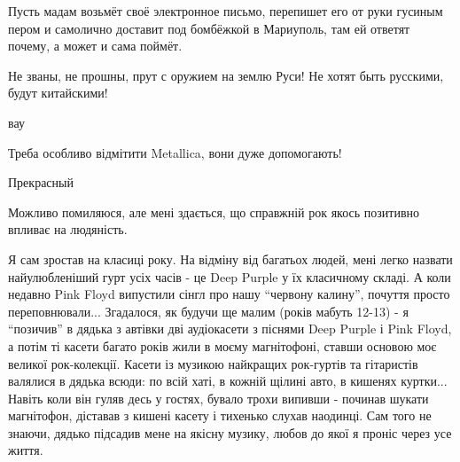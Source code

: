 \begin{itemize}
Пусть мадам возьмёт своё электронное письмо, перепишет его от руки гусиным
пером и самолично доставит под бомбёжкой в Мариуполь, там ей ответят почему, а
может и сама поймёт.

Не званы, не прошны, прут с оружием на землю Руси! Не хотят быть русскими,
будут китайскими!

вау

Треба особливо відмітити Metallica, вони дуже допомогають!

Прекрасный


Можливо помиляюся, але мені здається, що справжній рок якось позитивно впливає
на людяність.

Я сам зростав на класиці року. На відміну від багатьох людей, мені легко
назвати найулюбленіший гурт усіх часів - це Deep Purple у їх класичному складі.
А коли недавно Pink Floyd випустили сінгл про нашу \enquote{червону калину},
почуття просто переповнювали... Згадалося, як будучи ще малим (років мабуть
12-13) - я \enquote{позичив} в дядька з автівки дві аудіокасети з піснями Deep Purple і
Pink Floyd, а потім ті касети багато років жили в моєму магнітофоні, ставши
основою моє великої рок-колекції. Касети із музикою найкращих рок-гуртів та
гітаристів валялися в дядька всюди: по всій хаті, в кожній щілині авто, в
кишенях куртки... Навіть коли він гуляв десь у гостях, бувало трохи випивши -
починав шукати магнітофон, діставав з кишені касету і тихенько слухав наодинці.
Сам того не знаючи, дядько підсадив мене на якісну музику, любов до якої я
проніс через усе життя.

\end{itemize} %

